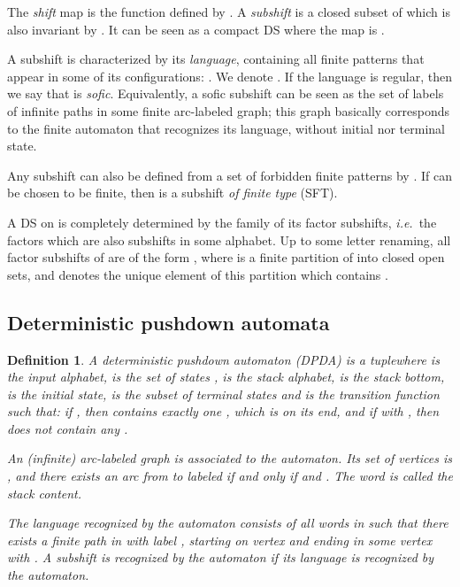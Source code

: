 \documentclass{llncs}
\newtheorem{defi}{Definition}
\newcommand{\ie}{\textit{i.e.}\ }
\begin{document}
The \emph{shift} map is the function  defined by .
A \emph{subshift}  is a closed subset of  which is also invariant by . It can be seen as a compact DS where the map is .

A subshift  is characterized by its \emph{language}, containing all finite patterns that appear in some of its configurations: . We denote .
If the language  is regular, then we say that  is \emph{sofic}.
Equivalently, a sofic subshift can be seen as the set of labels of infinite paths in some finite arc-labeled graph; this graph basically corresponds to the finite automaton that recognizes its language, without initial nor terminal state.

Any subshift can also be defined from a set of forbidden finite patterns  by .
If  can be chosen to be finite, then  is a subshift \emph{of finite type} (SFT).

A DS  on  is completely determined by the family of its factor subshifts, \ie the factors which are also subshifts in some alphabet.
Up to some letter renaming, all factor subshifts of  are of the form , where  is a finite partition of  into closed open sets, and  denotes the unique element of this partition which contains .
\subsection{Deterministic pushdown automata}
\begin{defi}
A \emph{deterministic pushdown automaton} (DPDA) is a tuple\break  where  is the \emph{input alphabet},  is the \emph{set of states },  is the \emph{stack alphabet},  is the \emph{stack bottom},  is the \emph{initial state},  is the \emph{subset of terminal states } and  is the \emph{transition function} such that: if , then  contains exactly one , which is on its end, and if  with , then  does not contain any .

An (infinite) arc-labeled graph  is associated to the automaton.
Its set of vertices is , and there exists an arc from  to  labeled  if and only if  and . The word  is called the \emph{stack content}.

The language  recognized by the automaton consists of all words  in  such that there exists a finite path in  with label , starting on vertex  and ending in some vertex  with . A subshift is recognized by the automaton if its language is recognized by the automaton.
\end{defi}
\newcommand{\pile}[2][]{(o_{#2},#1\mu^{#2})}
\newcommand{\pilo}[2][]{(o_{#2},#1\mu_0^{#2})}
\end{document}

